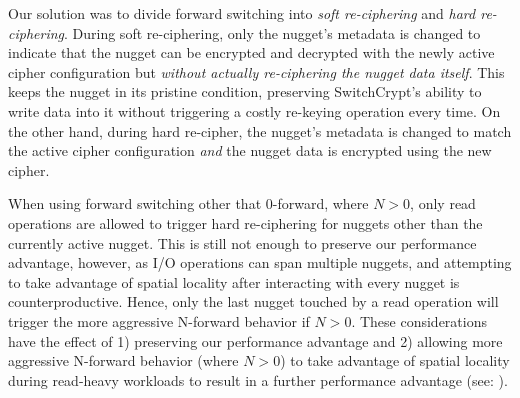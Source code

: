 Our solution was to divide forward switching into \emph{soft re-ciphering} and
\emph{hard re-ciphering}. During soft re-ciphering, only the nugget's metadata
is changed to indicate that the nugget can be encrypted and decrypted with the
newly active cipher configuration but \emph{without actually re-ciphering the
nugget data itself}. This keeps the nugget in its pristine condition, preserving
SwitchCrypt's ability to write data into it without triggering a costly
re-keying operation every time. On the other hand, during hard re-cipher, the
nugget's metadata is changed to match the active cipher configuration \emph{and}
the nugget data is encrypted using the new cipher.

When using forward switching other that 0-forward,  where $N > 0$,
only read operations are allowed to trigger hard re-ciphering for nuggets other
than the currently active nugget. This is still not enough to preserve our
performance advantage, however, as I/O operations can span multiple nuggets, and
attempting to take advantage of spatial locality after interacting with every
nugget is counterproductive. Hence, only the last nugget touched by a read
operation will trigger the more aggressive N-forward behavior if $N > 0$. These
considerations have the effect of 1) preserving our performance advantage and 2)
allowing more aggressive N-forward behavior (where $N > 0$) to take advantage of
spatial locality during read-heavy workloads to result in a further performance
advantage (see: ).
